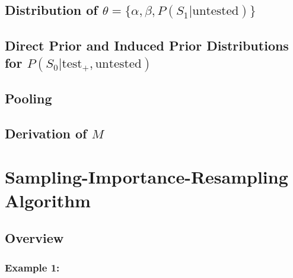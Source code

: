 \documentclass[12pt,twoside]{smiththesis}
\begin{document}
\hypertarget{distribution-of-theta-alpha-beta-ps_1textuntested}{%
\subsection{\texorpdfstring{Distribution of \(\theta = \{\alpha, \beta, P(S_1|\text{untested}) \}\)}{Distribution of \textbackslash theta = \textbackslash\{\textbackslash alpha, \textbackslash beta, P(S\_1\textbar\textbackslash text\{untested\}) \textbackslash\}}}\label{distribution-of-theta-alpha-beta-ps_1textuntested}}

\hypertarget{direct-prior-and-induced-prior-distributions-for-ps_0texttest_textuntested}{%
\subsection{\texorpdfstring{Direct Prior and Induced Prior Distributions for \(P(S_0|\text{test}_+,\text{untested})\)}{Direct Prior and Induced Prior Distributions for P(S\_0\textbar\textbackslash text\{test\}\_+,\textbackslash text\{untested\})}}\label{direct-prior-and-induced-prior-distributions-for-ps_0texttest_textuntested}}

\hypertarget{pooling}{%
\subsection{Pooling}\label{pooling}}

\hypertarget{derivation}{%
\subsection{\texorpdfstring{Derivation of \(M\)}{Derivation of M}}\label{derivation}}

\hypertarget{sampling-importance-resampling-algorithm}{%
\section{\texorpdfstring{Sampling-Importance-Resampling Algorithm \label{sampling}}{Sampling-Importance-Resampling Algorithm }}\label{sampling-importance-resampling-algorithm}}

\hypertarget{overview}{%
\subsection{Overview}\label{overview}}

\hypertarget{example-1}{%
\subsubsection{Example 1:}\label{example-1}}
\end{document}
